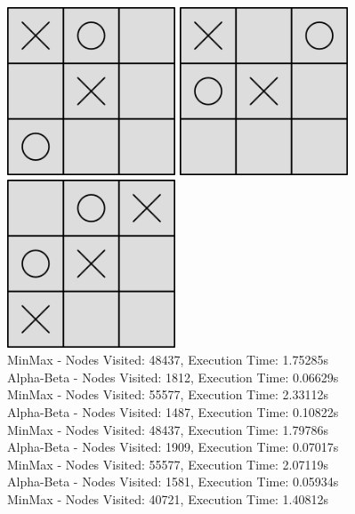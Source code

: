 \documentclass{article}
\begin{document}
\includegraphics[width=5cm, height=5cm]{midgamestate1.png}
\includegraphics[width=5cm, height=5cm]{midgamestate2.png}
\includegraphics[width=5cm, height=5cm]{midgamestate3.png}
\\
MinMax - Nodes Visited: 48437, Execution Time: 1.75285s\\
Alpha-Beta - Nodes Visited: 1812, Execution Time: 0.06629s\\
MinMax - Nodes Visited: 55577, Execution Time: 2.33112s\\
Alpha-Beta - Nodes Visited: 1487, Execution Time: 0.10822s\\
MinMax - Nodes Visited: 48437, Execution Time: 1.79786s\\
Alpha-Beta - Nodes Visited: 1909, Execution Time: 0.07017s\\
MinMax - Nodes Visited: 55577, Execution Time: 2.07119s\\
Alpha-Beta - Nodes Visited: 1581, Execution Time: 0.05934s\\
MinMax - Nodes Visited: 40721, Execution Time: 1.40812s\\
\end{document}
